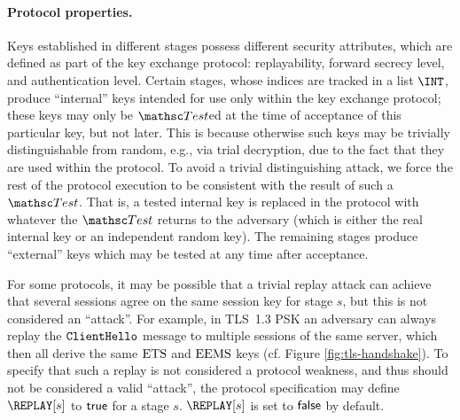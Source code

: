 \paragraph{Protocol properties.}
Keys established in different stages possess different security attributes, which are defined as part of the key exchange protocol: replayability, forward secrecy level, and authentication level. 
Certain stages, whose indices are tracked in a list $\INT$, produce ``internal'' keys intended for use only within the key exchange protocol; these keys may only be $\Test$ed at the time of acceptance of this particular key, but not later.
This is because otherwise such keys may be trivially distinguishable from random, e.g., via trial decryption, due to the fact that they are used within the protocol.
To avoid a trivial distinguishing attack, we force the rest of the protocol execution to be consistent with the result of such a $\Test$.
That is, a tested internal key is replaced in the protocol with whatever the $\Test$ returns to the adversary (which is either the real internal key or an independent random key).
The remaining stages produce ``external'' keys which may be tested at any time after acceptance. 

For some protocols, it may be possible that a trivial replay attack can achieve that several sessions agree on the same session key for stage $s$, but this is not considered an ``attack''.
For example, in TLS~1.3 PSK an adversary can always replay the $\mathtt{ClientHello}$ message to multiple sessions of the same server, which then all derive the same $\mathrm{ETS}$ and $\mathrm{EEMS}$ keys (cf. Figure \ref{fig:tls-handshake}).
%
To specify that such a replay is not considered a protocol weakness, and thus should not be considered a valid ``attack'', the protocol specification may define $\REPLAY[s]$ to $\mathsf{true}$ for a stage $s$. $\REPLAY[s]$ is set to $\mathsf{false}$ by default. 

